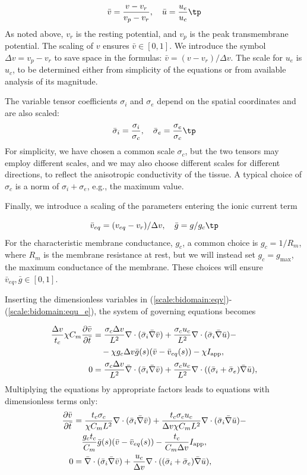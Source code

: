 \documentclass[graybox,envcountchap,sectrefs,final]{svmonodo}
\begin{document}
\[ \bar v = \frac{v-v_r}{v_p-v_r},\quad \bar u = \frac{u_e}{u_c} \tp\]
As noted above, $v_r$ is the resting potential, and $v_p$ is the peak
transmembrane potential.
The scaling of $v$ ensures $\bar v\in [0,1]$. We introduce the symbol
$\Delta v = v_p-v_r$ to save space in the formulas: $\bar v = (v-v_r)/\Delta v$.
The scale for $u_e$ is $u_c$, to be
determined either from simplicity of the equations or from available analysis of
its magnitude.

The variable tensor coefficients $\sigma_i$ and $\sigma_e$ depend on the spatial
coordinates and are also scaled:
\[ \bar \sigma_i = \frac{\sigma_i}{\sigma_c},\quad \bar \sigma_e = \frac{\sigma_e}{\sigma_c}\tp\]
For simplicity, we have chosen a common scale $\sigma_c$, but the two tensors
may employ different scales, and we may also choose different scales
for different directions, to reflect the anisotropic conductivity of
the tissue. A typical choice of $\sigma_c$ is a norm of
$\sigma_i + \sigma_e$, e.g., the maximum value.

Finally, we introduce a scaling of the parameters entering the ionic
current term

\[ \bar v_{eq} = (v_{eq}-v_r)/\Delta v,\quad\bar g = g/g_c\tp\]
For the characteristic membrane conductance, $g_c$,  a common choice is
$g_c = 1/R_m$, where $R_m$ is the membrane resistance at
rest, but we will instead set $g_c = g_{\max}$, the maximum conductance
of the membrane. These choices will ensure $\bar v_{eq}, \bar g \in
[0,1]$.


Inserting the dimensionless variables in
(\ref{scale:bidomain:eqv})-(\ref{scale:bidomain:equ_e}), the system
of governing equations becomes

\begin{align*}
\frac{\Delta v}{t_c}\chi C_m\frac{\partial \bar v}{\partial \bar t} &=
\frac{\sigma_c\Delta v }{L^2}\nabla\cdot( \bar \sigma_i\bar\nabla\bar v) +
\frac{\sigma_c u_c}{L^2}\nabla\cdot (\bar \sigma_i\bar \nabla \bar u) -\\ 
&\quad - \chi g_c \Delta v \bar g (s)(\bar v-\bar v_{eq}(s)) -\chi I_{\rm{app}},
\\ 
0 &= \frac{\sigma_c\Delta v }{L^2}\bar \nabla\cdot( \bar \sigma_i\bar \nabla \bar v) + \frac{\sigma_cu_c}{L^2}\nabla\cdot ((\bar \sigma_i + \bar \sigma_e)\bar \nabla \bar u),\\ 
\end{align*}
Multiplying the equations by appropriate factors leads to equations with
dimensionless terms only:
\begin{align*}
\frac{\partial \bar v}{\partial \bar t} &=
\frac{t_c\sigma_c}{\chi C_mL^2}\nabla\cdot( \bar \sigma_i\bar\nabla\bar v) +
\frac{t_c\sigma_c u_c}{\Delta v \chi C_mL^2}\nabla\cdot (\bar
\sigma_i\bar \nabla \bar u) - \\ 
&\quad
\frac{g_c t_c}{C_m} \bar g (s)(\bar v-\bar v_{eq}(s))
- \frac{t_c}{C_m\Delta v} I_{\rm{app}},\\ 
0 &= \bar \nabla\cdot( \bar \sigma_i\bar \nabla \bar v) + \frac{u_c}{\Delta v}\nabla\cdot ((\bar \sigma_i + \bar \sigma_e)\bar \nabla \bar u),\\ 
\end{align*}
\end{document}
